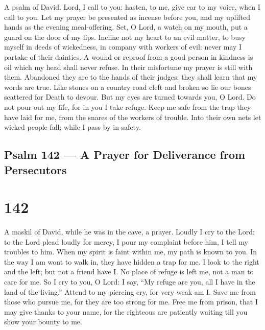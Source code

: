 A psalm of David.  Lord, I call to you: hasten, to me, give
ear to my voice, when I call to you.  Let my prayer be
presented as incense before you, and my uplifted hands as the evening
meal-offering.  Set, O Lord, a watch on my mouth, put a
guard on the door of my lips.  Incline not my heart to an
evil matter, to busy myself in deeds of wickedness, in company with
workers of evil: never may I partake of their dainties.  A
wound or reproof from a good person in kindness is oil which my head
shall never refuse. In their misfortune my prayer is still with them.
 Abandoned they are to the hands of their judges: they shall
learn that my words are true.  Like stones on a country road
cleft and broken so lie our bones scattered for Death to devour.
 But my eyes are turned towards you, O Lord. Do not pour out
my life, for in you I take refuge.  Keep me safe from the
trap they have laid for me, from the snares of the workers of trouble.
 Into their own nets let wicked people fall; while I pass
by in safety.

\hypertarget{psalm-142-a-prayer-for-deliverance-from-persecutors}{%
\subsection{Psalm 142 --- A Prayer for Deliverance from
Persecutors}\label{psalm-142-a-prayer-for-deliverance-from-persecutors}}

\hypertarget{section-141}{%
\section{142}\label{section-141}}

A maskil of David, while he was in the cave, a prayer. 
Loudly I cry to the Lord: to the Lord plead loudly for mercy,
 I pour my complaint before him, I tell my troubles to him.
 When my spirit is faint within me, my path is known to you.
In the way I am wont to walk in, they have hidden a trap for me.
 I look to the right and the left; but not a friend have I.
No place of refuge is left me, not a man to care for me.  So
I cry to you, O Lord: I say, ``My refuge are you, all I have in the land
of the living.''  Attend to my piercing cry, for very weak
am I. Save me from those who pursue me, for they are too strong for me.
 Free me from prison, that I may give thanks to your name,
for the righteous are patiently waiting till you show your bounty to me.

